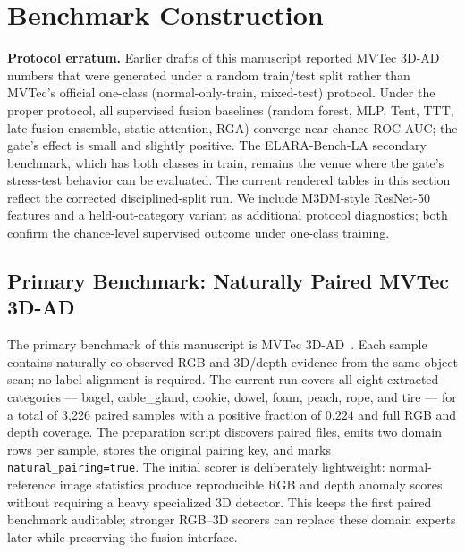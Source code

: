 \documentclass[10pt,conference]{IEEEtran}
\newcommand{\method}{RGA}
\newcommand{\benchmark}{ELARA-Bench-LA}
\begin{document}
\section{Benchmark Construction}

\noindent\textbf{Protocol erratum.} Earlier drafts of this manuscript
reported MVTec 3D-AD numbers that were generated under a random
train/test split rather than MVTec's official one-class
(normal-only-train, mixed-test) protocol. Under the proper protocol,
all supervised fusion baselines (random forest, MLP, Tent, TTT,
late-fusion ensemble, static attention, \method) converge near chance
ROC-AUC; the gate's effect is small and slightly positive. The
\benchmark{} secondary benchmark, which has both classes in train,
remains the venue where the gate's stress-test behavior can be
evaluated. The current rendered tables in this section reflect the
corrected disciplined-split run. We include M3DM-style ResNet-50 features
and a held-out-category
variant as additional protocol diagnostics; both confirm the
chance-level supervised outcome under one-class training.

\subsection{Primary Benchmark: Naturally Paired MVTec 3D-AD}
The primary benchmark of this manuscript is MVTec 3D-AD~\cite{bergmann2022mvtec3d}.
Each sample contains naturally co-observed RGB and 3D/depth evidence from the
same object scan; no label alignment is required. The current run covers all
eight extracted categories — bagel, cable\_gland, cookie, dowel, foam, peach,
rope, and tire — for a total of 3{,}226 paired samples with a positive
fraction of $0.224$ and full RGB and depth coverage. The preparation script
discovers paired files, emits two domain rows per sample, stores the original
pairing key, and marks \texttt{natural\_pairing=true}. The initial scorer is
deliberately lightweight: normal-reference image statistics produce
reproducible RGB and depth anomaly scores without requiring a heavy
specialized 3D detector. This keeps the first paired benchmark auditable;
stronger RGB--3D scorers can replace these domain experts later while
preserving the fusion interface.

\end{document}

